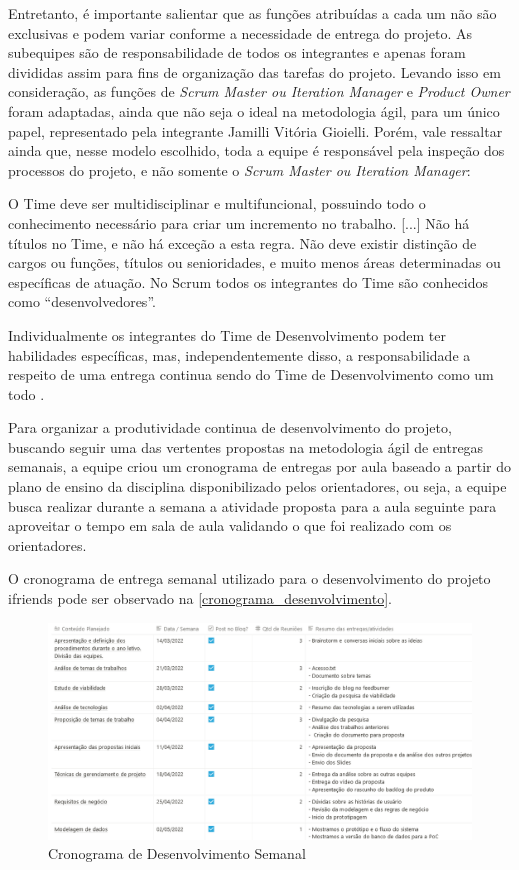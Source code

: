 Entretanto, é importante salientar que as funções atribuídas a cada um não são exclusivas e podem variar conforme a necessidade de entrega do projeto. As subequipes são de responsabilidade de todos os integrantes e apenas foram divididas assim para fins de organização das tarefas do projeto. Levando isso em consideração, as funções de \textsl{Scrum Master ou Iteration Manager} e \textsl{Product Owner} foram adaptadas, ainda que não seja o ideal na metodologia ágil, para um único papel, representado pela integrante Jamilli Vitória Gioielli. Porém, vale ressaltar ainda que, nesse modelo escolhido, toda a equipe é responsável pela inspeção dos processos do projeto, e não somente o \textsl{Scrum Master ou Iteration Manager}:

\begin{citacao}
O Time deve ser multidisciplinar e multifuncional, possuindo todo o conhecimento necessário para criar um incremento no trabalho. [...] Não há títulos no Time, e não há exceção a esta regra. Não deve existir distinção de cargos ou funções, títulos ou senioridades, e muito menos áreas determinadas ou específicas de atuação. No Scrum todos os integrantes do Time são conhecidos como “desenvolvedores”.

Individualmente os integrantes do Time de Desenvolvimento podem ter habilidades específicas, mas, independentemente disso, a responsabilidade a respeito de uma entrega continua sendo do Time de Desenvolvimento como um todo \cite{cruz:2018}.
\end{citacao}

Para organizar a produtividade continua de desenvolvimento do projeto, buscando seguir uma das vertentes propostas na metodologia ágil de entregas semanais, a equipe criou um cronograma de entregas por aula baseado a partir do plano de ensino da disciplina disponibilizado pelos orientadores, ou seja, a equipe busca realizar durante a semana a atividade proposta para a aula seguinte para aproveitar o tempo em sala de aula validando o que foi realizado com os orientadores. 

O cronograma de entrega semanal utilizado para o desenvolvimento do projeto \gls{ifriends} pode ser observado na \autoref{cronograma_desenvolvimento}.

\begin{figure}[htb]
\centering
\caption{Cronograma de Desenvolvimento Semanal}
\label{cronograma_desenvolvimento}
\includegraphics[width=1.0\textwidth]{anexos/Imagens_Proposta/cronograma_desenvolvimento.png}
\end{figure}
\FloatBarrier

